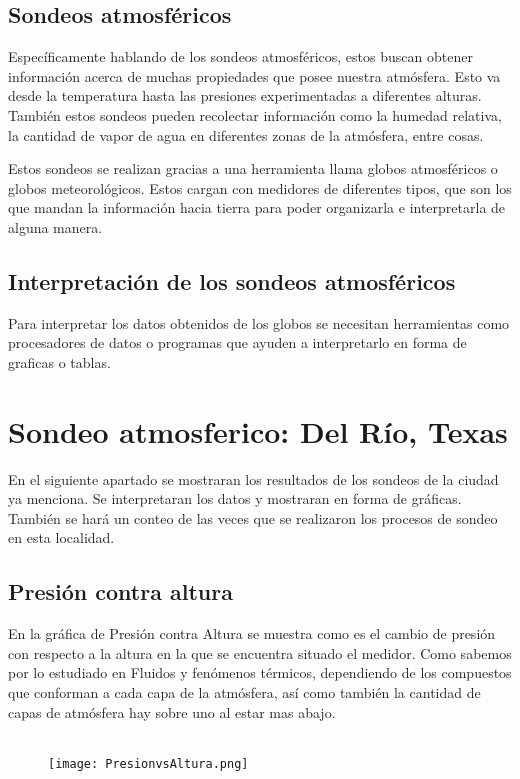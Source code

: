 \documentclass[12pt,letterpaper]{article}
\begin{document}
\begin{portada}
\subsection{Sondeos atmosféricos}
Específicamente hablando de los sondeos atmosféricos, estos buscan obtener información acerca de muchas propiedades que posee nuestra atmósfera. Esto va desde la temperatura hasta las presiones experimentadas a diferentes alturas. También estos sondeos pueden recolectar información como la humedad relativa, la cantidad de vapor de agua en diferentes zonas de la atmósfera, entre cosas.

Estos sondeos se realizan gracias a una herramienta llama globos atmosféricos o globos meteorológicos. Estos cargan con medidores de diferentes tipos, que son los que mandan la información hacia tierra para poder organizarla e interpretarla de alguna manera.
\subsection{Interpretación de los sondeos atmosféricos}
Para interpretar los datos obtenidos de los globos se necesitan herramientas como procesadores de datos o programas que ayuden a interpretarlo en forma de graficas o tablas. 


\section{Sondeo atmosferico: Del Río, Texas}
En el siguiente apartado se mostraran los resultados de los sondeos de la ciudad ya menciona. Se interpretaran los datos y mostraran en forma de gráficas. También se hará un conteo de las veces que se realizaron los procesos de sondeo en esta localidad.


\subsection{Presión contra altura}
En la gráfica de Presión contra Altura se muestra como es el cambio de presión con respecto a la altura en la que se encuentra situado el medidor. Como sabemos por lo estudiado en Fluidos y fenómenos térmicos, dependiendo de los compuestos que conforman a cada capa de la atmósfera, así como también la cantidad de capas de atmósfera hay sobre uno al estar mas abajo.\\\\

\begin{figure}[htb]
\begin{center}
\texttt{[image: PresionvsAltura.png]}
\end{center}
\end{figure}


\end{portada}
\end{document}
